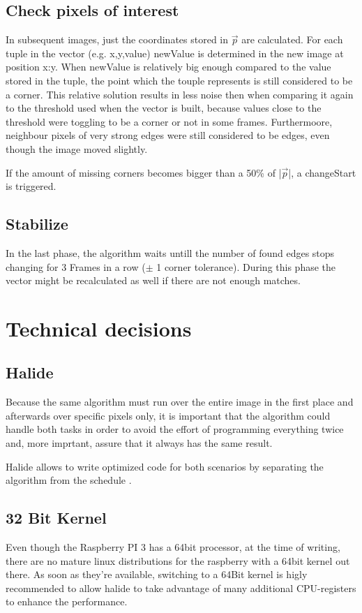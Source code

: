 \section{ Check pixels of interest}
In subsequent images, just the coordinates stored in $\vec{p}$ are calculated.  For each tuple in the vector (e.g. x,y,value) newValue is determined in the new image at position x:y. When newValue is relatively big enough compared to the value stored in the tuple, the point which the touple represents is still considered to be a corner. This relative solution results in less noise then when comparing it again to the threshold used when the vector is built, because values close to the threshold were toggling to be a corner or not in some frames. Furthermoore, neighbour pixels of very strong edges were still considered to be edges, even though the image moved slightly. 

If the amount of missing corners becomes bigger than a 50\% of |$\vec{p}$|, a changeStart is triggered.

\section{ Stabilize}
In the last phase, the algorithm waits untill the number of found edges stops changing for 3 Frames in a row ($\pm$ 1 corner tolerance). During this phase the vector might be recalculated as well if there are not enough matches.



\chapter{Technical decisions}
\section{Halide}
Because the same algorithm must run over the entire image in the first place and afterwards over specific pixels only, it is important that the  algorithm could handle both tasks in order to avoid the effort of programming everything twice and, more imprtant, assure that it always has the same result. 

Halide allows to write optimized code for both scenarios by separating the algorithm from the schedule \cite{halide}.

\section{32 Bit Kernel}
Even though the Raspberry PI 3 has a 64bit processor, at the time of writing, there are no mature linux distributions for the raspberry with a 64bit kernel out there. As soon as they're available, switching to a 64Bit kernel is higly recommended to allow halide to take advantage of many additional CPU-registers to enhance the performance.



